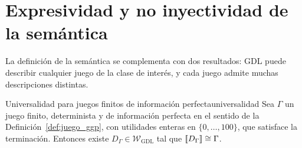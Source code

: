 \section{Expresividad y no inyectividad de la semántica}
\label{sec:an_expresividad}

La definición de la semántica se complementa con dos resultados: GDL puede describir cualquier juego de la clase de interés, y cada juego admite muchas descripciones distintas.

\begin{proposicion}{Universalidad para juegos finitos de información perfecta}{universalidad}
Sea $\Gamma$ un juego finito, determinista y de información perfecta en el sentido de la Definición~\ref{def:juego_ggp}, con utilidades enteras en $\{0, \dots, 100\}$, que satisface la terminación. Entonces existe $D_\Gamma \in \mathcal W_{\mathrm{GDL}}$ tal que $[\![D_\Gamma]\!] \cong \Gamma$.
\end{proposicion}

